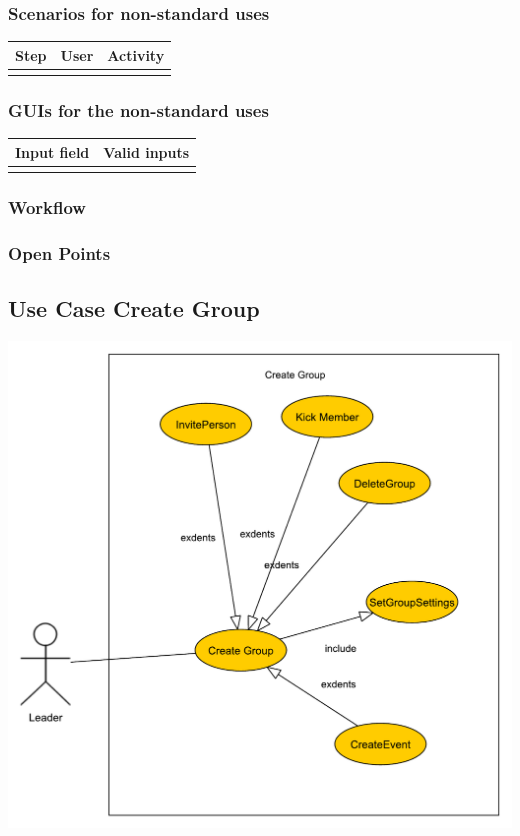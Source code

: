 \documentclass[12pt]{article}
\theoremstyle{definition}
\begin{document}
\subsubsection{Scenarios for non-standard uses}

\begin{tabular}{|l|l|l|}
\hline
Step & User & Activity \\ \hline
 & & \\ \hline
\end{tabular}

\subsubsection{GUIs for the non-standard uses}

\begin{tabular}{|l|l|}
\hline
Input field & Valid inputs \\ \hline
 &  \\ \hline
\end{tabular}

\subsubsection{Workflow}

\subsubsection{Open Points}
\subsection{Use Case Create Group}

\includegraphics[scale=.5]{CreateGroup.pdf}
\end{document}
